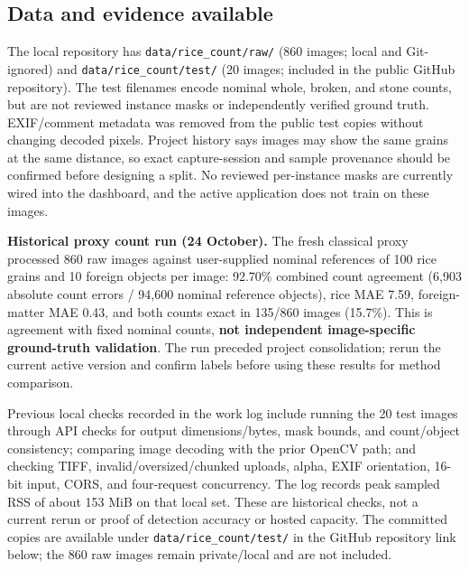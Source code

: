 \documentclass[10pt,a4paper]{article}
\begin{document}
\subsection{Data and evidence available}
The local repository has \texttt{data/rice\_count/raw/} (860 images; local and Git-ignored) and \texttt{data/rice\_count/test/} (20 images; included in the public GitHub repository). The test filenames encode nominal whole, broken, and stone counts, but are not reviewed instance masks or independently verified ground truth. EXIF/comment metadata was removed from the public test copies without changing decoded pixels. Project history says images may show the same grains at the same distance, so exact capture-session and sample provenance should be confirmed before designing a split. No reviewed per-instance masks are currently wired into the dashboard, and the active application does not train on these images.

\textbf{Historical proxy count run (24 October).} The fresh classical proxy processed 860 raw images against user-supplied nominal references of 100 rice grains and 10 foreign objects per image: 92.70\% combined count agreement (6,903 absolute count errors / 94,600 nominal reference objects), rice MAE 7.59, foreign-matter MAE 0.43, and both counts exact in 135/860 images (15.7\%). This is agreement with fixed nominal counts, \textbf{not independent image-specific ground-truth validation}. The run preceded project consolidation; rerun the current active version and confirm labels before using these results for method comparison.

Previous local checks recorded in the work log include running the 20 test images through API checks for output dimensions/bytes, mask bounds, and count/object consistency; comparing image decoding with the prior OpenCV path; and checking TIFF, invalid/oversized/chunked uploads, alpha, EXIF orientation, 16-bit input, CORS, and four-request concurrency. The log records peak sampled RSS of about 153 MiB on that local set. These are historical checks, not a current rerun or proof of detection accuracy or hosted capacity. The committed copies are available under \texttt{data/rice\_count/test/} in the GitHub repository link below; the 860 raw images remain private/local and are not included.
\end{document}
